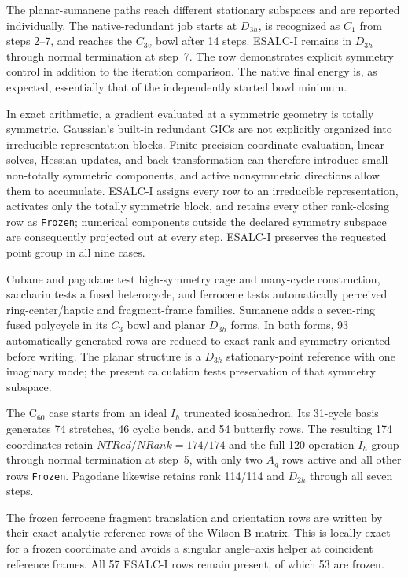 \documentclass[10pt]{article}
\begin{document}
{{The planar-sumanene paths reach different stationary subspaces
and are reported individually.}  The native-redundant job
starts at \(D_{3h}\), is recognized as \(C_1\) from steps 2--7, and reaches
the \(C_{3v}\) bowl after 14 steps.  ESALC-I remains in \(D_{3h}\) through
normal termination at step~7.  The row demonstrates explicit symmetry control
in addition to the iteration comparison.  The native final energy is, as
expected, essentially that of the independently started bowl minimum.

In exact arithmetic, a gradient evaluated at a symmetric geometry is totally
symmetric.  {Gaussian's built-in redundant GICs are not explicitly}
organized into irreducible-representation blocks.  Finite-precision coordinate
evaluation, linear solves, Hessian updates, and back-transformation can
therefore introduce small non-totally symmetric components, and active
nonsymmetric directions allow them to accumulate.  ESALC-I assigns every row to
an irreducible representation, activates only the totally symmetric block, and
retains every other rank-closing row as \texttt{Frozen}; numerical components
outside the declared symmetry subspace are consequently projected out at every
step.  ESALC-I preserves the requested point group in all nine cases.

Cubane and pagodane test
high-symmetry cage and many-cycle construction, saccharin tests a fused
heterocycle, and ferrocene tests automatically perceived ring-center/haptic and
fragment-frame families.  Sumanene adds a seven-ring fused polycycle in its
\(C_3\) bowl and planar \(D_{3h}\) forms.  In both forms, 93 automatically
generated rows are reduced to exact rank and symmetry oriented before
writing.  The planar structure is a \(D_{3h}\) stationary-point
reference with one imaginary mode; the present calculation tests preservation
of that symmetry subspace.

The C$_{60}$ case starts from an ideal \(I_h\) truncated icosahedron.  Its
31-cycle basis generates 74 stretches, 46 cyclic bends, and 54 butterfly rows.
The resulting 174 coordinates retain \(NTRed/NRank=174/174\) and the full
120-operation \(I_h\) group through normal termination at step~5, with only
two \(A_g\) rows active and all other rows \texttt{Frozen}.  Pagodane likewise
retains rank 114/114 and \(D_{2h}\) through all seven steps.

The frozen ferrocene fragment translation and orientation rows are written
by their exact analytic reference {rows of the Wilson B matrix}.  This is locally exact for a
frozen coordinate and avoids a singular angle--axis helper at coincident
reference frames.  All 57 ESALC-I rows remain present, of which 53 are frozen.

}
\end{document}
